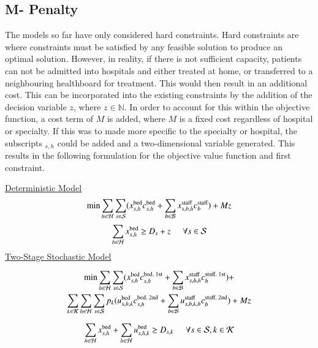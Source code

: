 \documentclass[../thesis.tex]{subfiles}
\begin{document}
\subsection{M- Penalty}
The models so far have only considered hard constraints. Hard constraints are where constraints must be satisfied by any feasible solution to produce an optimal solution. However, in reality, if there is not sufficient capacity, patients can not be admitted into hospitals and either treated at home, or transferred to a neighbouring healthboard for treatment. This would then result in an additional cost. This can be incorporated into the existing constraints by the addition of the decision variable $z$, where $z \in \mathbb{N}$. In order to account for this within the objective function, a cost term of $M$ is added, where $M$ is a fixed cost regardless of hospital or specialty. If this was to made more specific to the specialty or hospital, the subscripts $_{s,h}$ could be added and a two-dimensional variable generated. This results in the following formulation for the objective value function and first constraint.

\underline{Deterministic Model}
\begin{equation}\label{eq:det_objective}
    \min \sum_{h\in\mathcal{H}}\sum_{s\in\mathcal{S}}(x^\textnormal{bed}_{s,h}c^\textnormal{bed}_{s,h} + \sum_{b\in\mathcal{B}}x^\textnormal{staff}_{s,b,h}c^\textnormal{staff}_{b}) + Mz
\end{equation}
\begin{equation}
    \sum_{h\in\mathcal{H}} x^\textnormal{bed}_{s,h}\geq D_{s} + z \hspace{0.5cm} \forall  s \in \mathcal{S}
\end{equation}
\underline{Two-Stage Stochastic Model}

\begin{multline}\label{eq:sto_objectiveupdate}
    \min \sum_{h\in\mathcal{H}}\sum_{s\in\mathcal{S}}(x^\textnormal{bed}_{s,h}c^\textnormal{bed, 1st}_{s,h} + \sum_{b\in\mathcal{B}}x^\textnormal{staff}_{s,b,h}c^\textnormal{staff, 1st}_{b}) +\\ 
    \sum_{k\in\mathcal{K}}\sum_{h\in\mathcal{H}}\sum_{s\in\mathcal{S}}p_{k}(u^\textnormal{bed}_{s,h,k}c^\textnormal{bed, 2nd}_{s,h} +
   \sum_{b\in\mathcal{B}} u^\textnormal{staff}_{s,b,k,h}c^\textnormal{staff, 2nd}_{b}) + Mz
\end{multline}

\begin{equation}
    \sum_{h\in\mathcal{H}} x^\textnormal{bed}_{s,h} +  \sum_{h\in\mathcal{H}} u^\textnormal{bed}_{s,h,k} \geq D_{s,k} \hspace{0.5cm} \forall s \in \mathcal{S}, k \in \mathcal{K}\\
\end{equation}
\end{document}
